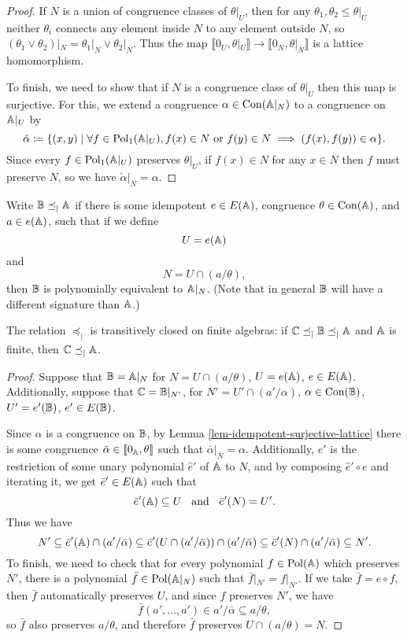 \begin{appendices}
\begin{proof}
If $N$ is a union of congruence classes of $\theta|_U$, then for any $\theta_1, \theta_2 \le \theta|_U$ neither $\theta_i$ connects any element inside $N$ to any element outside $N$, so $(\theta_1 \vee \theta_2)|_N = \theta_1|_N \vee \theta_2|_N$. Thus the map $\llbracket 0_U, \theta|_U \rrbracket \rightarrow \llbracket 0_N, \theta|_N \rrbracket$ is a lattice homomorphism.

To finish, we need to show that if $N$ is a congruence class of $\theta|_U$ then this map is surjective. For this, we extend a congruence $\alpha \in \operatorname{Con}(\mathbb{A}|_N)$ to a congruence on $\mathbb{A}|_U$ by
\[
\check{\alpha} \coloneqq \{(x,y) \mid \forall f \in \operatorname{Pol}_1(\mathbb{A}|_U), f(x) \in N\text{ or }f(y)\in N \implies (f(x),f(y)) \in \alpha\}.
\]
Since every $f \in \operatorname{Pol}_1(\mathbb{A}|_U)$ preserves $\theta|_U$, if $f(x) \in N$ for any $x \in N$ then $f$ must preserve $N$, so we have $\check{\alpha}|_N = \alpha$.
\end{proof}

\begin{defn}\label{defn-restrict-order} Write $\mathbb{B} \preceq_| \mathbb{A}$ if there is some idempotent $e \in E(\mathbb{A})$, congruence $\theta \in \operatorname{Con}(\mathbb{A})$, and $a \in e(\mathbb{A})$, such that if we define
\[
U = e(\mathbb{A})
\]
and
\[
N = U \cap (a/\theta),
\]
then $\mathbb{B}$ is polynomially equivalent to $\mathbb{A}|_N$. (Note that in general $\mathbb{B}$ will have a different signature than $\mathbb{A}$.)
\end{defn}

\begin{prop}\label{prop-restrict-transitive} The relation $\preceq_|$ is transitively closed on finite algebras: if $\mathbb{C} \preceq_| \mathbb{B} \preceq_| \mathbb{A}$ and $\mathbb{A}$ is finite, then $\mathbb{C} \preceq_| \mathbb{A}$.
\end{prop}
\begin{proof} Suppose that $\mathbb{B} = \mathbb{A}|_N$ for $N = U \cap (a/\theta)$, $U = e(\mathbb{A})$, $e \in E(\mathbb{A})$. Additionally, suppose that $\mathbb{C} = \mathbb{B}|_{N'}$, for $N' = U' \cap (a'/\alpha)$, $\alpha \in \operatorname{Con}(\mathbb{B})$, $U' = e'(\mathbb{B})$, $e' \in E(\mathbb{B})$.

Since $\alpha$ is a congruence on $\mathbb{B}$, by Lemma \ref{lem-idempotent-surjective-lattice} there is some congruence $\bar{\alpha} \in \llbracket 0_{\mathbb{A}}, \theta \rrbracket$ such that $\bar{\alpha}|_N = \alpha$. Additionally, $e'$ is the restriction of some unary polynomial $\hat{e}'$ of $\mathbb{A}$ to $N$, and by composing $\hat{e}' \circ e$ and iterating it, we get $\bar{e}' \in E(\mathbb{A})$ such that
\[
\bar{e}'(\mathbb{A}) \subseteq U \;\; \text{ and } \;\; \bar{e}'(N) = U'.
\]
Thus we have
\[
N' \subseteq \bar{e}'(\mathbb{A}) \cap (a'/\bar{\alpha}) \subseteq \bar{e}'(U \cap (a'/\bar{\alpha})) \cap (a'/\bar{\alpha}) \subseteq \bar{e}'(N) \cap (a'/\bar{\alpha}) \subseteq N'.
\]
To finish, we need to check that for every polynomial $f \in \operatorname{Pol}(\mathbb{A})$ which preserves $N'$, there is a polynomial $\bar{f} \in \operatorname{Pol}(\mathbb{A}|_N)$ such that $\bar{f}|_{N'} = f|_{N'}$. If we take $\bar{f} = e \circ f$, then $\bar{f}$ automatically preserves $U$, and since $f$ preserves $N'$, we have
\[
\bar{f}(a', ..., a') \in a'/\bar{\alpha} \subseteq a/\theta,
\]
so $\bar{f}$ also preserves $a/\theta$, and therefore $\bar{f}$ preserves $U \cap (a/\theta) = N$.
\end{proof}


\end{appendices}
